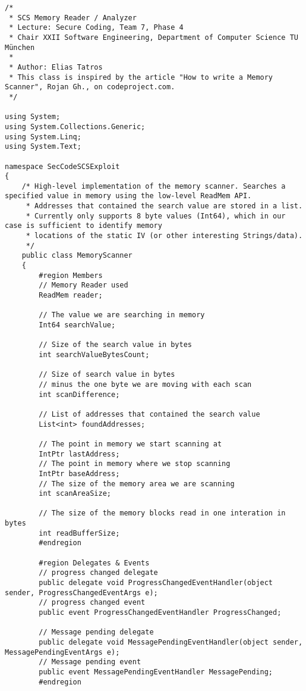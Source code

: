 \begin{lstlisting}
/* 
 * SCS Memory Reader / Analyzer
 * Lecture: Secure Coding, Team 7, Phase 4
 * Chair XXII Software Engineering, Department of Computer Science TU München
 *
 * Author: Elias Tatros
 * This class is inspired by the article "How to write a Memory Scanner", Rojan Gh., on codeproject.com.
 */

using System;
using System.Collections.Generic;
using System.Linq;
using System.Text;

namespace SecCodeSCSExploit
{
    /* High-level implementation of the memory scanner. Searches a specified value in memory using the low-level ReadMem API.
     * Addresses that contained the search value are stored in a list.
     * Currently only supports 8 byte values (Int64), which in our case is sufficient to identify memory
     * locations of the static IV (or other interesting Strings/data).
     */
    public class MemoryScanner
    {
        #region Members
        // Memory Reader used
        ReadMem reader;

        // The value we are searching in memory
        Int64 searchValue;

        // Size of the search value in bytes
        int searchValueBytesCount;

        // Size of search value in bytes
        // minus the one byte we are moving with each scan
        int scanDifference;

        // List of addresses that contained the search value
        List<int> foundAddresses;

        // The point in memory we start scanning at
        IntPtr lastAddress;
        // The point in memory where we stop scanning
        IntPtr baseAddress;
        // The size of the memory area we are scanning
        int scanAreaSize;

        // The size of the memory blocks read in one interation in bytes
        int readBufferSize;
        #endregion

        #region Delegates & Events
        // progress changed delegate
        public delegate void ProgressChangedEventHandler(object sender, ProgressChangedEventArgs e);
        // progress changed event
        public event ProgressChangedEventHandler ProgressChanged;

        // Message pending delegate
        public delegate void MessagePendingEventHandler(object sender, MessagePendingEventArgs e);
        // Message pending event
        public event MessagePendingEventHandler MessagePending;
        #endregion


\end{lstlisting}
